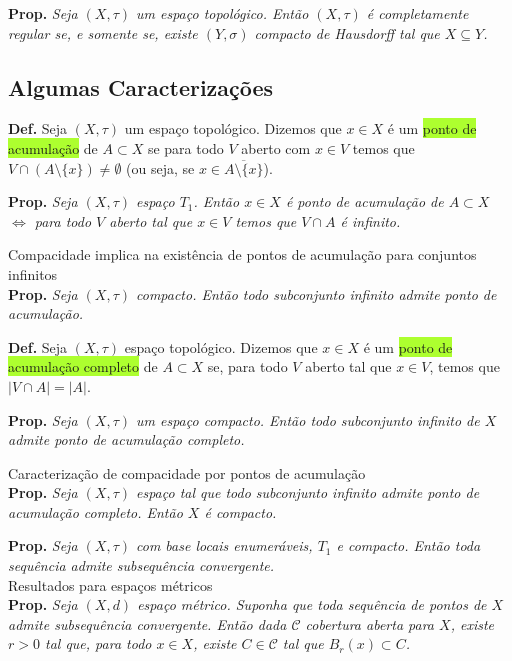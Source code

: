 \documentclass{article}
\begin{document}
\begin{landscape}
\begin{multicols}{3}
\textbf{Prop.} \textit{Seja $(X, \tau)$ um espaço topológico. Então $(X, \tau)$ é completamente regular se, e somente se, existe $(Y, \sigma)$ compacto de Hausdorff tal que $X \subseteq Y$.}\medskip

\subsection{Algumas Caracterizações}
\textbf{Def.} Seja $(X, \tau)$ um espaço topológico. Dizemos que $x \in X$ é um \colorbox{GreenYellow}{ponto de acumulação} de $A \subset X$ se para todo $V$ aberto com $x\in V$ temos que $V \cap (A\setminus\{x\})\neq \emptyset$  (ou seja, se $x \in \overline{A \setminus \{x\}}$).\medskip

\textbf{Prop.} \textit{Seja $(X, \tau)$ espaço $T_1$. Então $x \in X$ é ponto de acumulação de $A \subset X$ $\Leftrightarrow$ para todo $V$ aberto tal que $x \in V$ temos que $V \cap A$ é infinito.}\medskip

\color{Emerald} Compacidade implica na existência de pontos de acumulação para conjuntos infinitos\\ \color{black}
\textbf{Prop.}\textit{ Seja $(X, \tau)$ compacto. Então todo subconjunto infinito admite ponto de acumulação.}\medskip

\textbf{Def.} Seja $(X, \tau)$ espaço topológico. Dizemos que $x \in X$ é um \colorbox{GreenYellow}{ponto de acumulação completo} de $A \subset X$ se, para todo $V$ aberto tal que $x \in V$, temos que $|V \cap A |= |A|$.\medskip

\textbf{Prop.} \textit{Seja $(X, \tau)$ um espaço compacto. Então todo subconjunto infinito de $X$ admite ponto de acumulação completo.}\medskip

\color{Emerald} Caracterização de compacidade por pontos de acumulação\\ \color{black}
\textbf{Prop.} \textit{Seja $(X, \tau)$ espaço tal que todo subconjunto infinito admite ponto de acumulação completo. Então $X$ é compacto.}\medskip

\textbf{Prop.} \textit{Seja $(X, \tau)$ com base locais enumeráveis, $T_1$ e compacto. Então toda sequência admite subsequência convergente.}\\

\colorbox{cinza}{Resultados para espaços métricos}\\
\textbf{Prop.} \textit{Seja $(X, d)$ espaço métrico. Suponha que toda sequência de pontos de $X$ admite subsequência convergente. Então dada $\mathcal{C}$ cobertura aberta para $X$, existe $r > 0$ tal que, para todo $x \in X$, existe $C \in \mathcal{C}$ tal que $B_r(x) \subset C$.}\\


\end{multicols}
\end{landscape}
\end{document}
